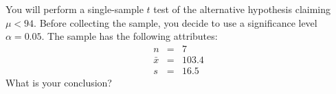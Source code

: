 \documentclass[11pt,containsverbatim,handout]{beamer}
\newcommand{\soln}[1]{ }
\begin{document}
\begin{frame}
You will perform a single-sample \(t\) test of the alternative
hypothesis claiming \(\mu<94\). Before collecting the sample, you decide to use a significance level \(\alpha = 0.05\). The sample has the following attributes: \[\begin{aligned}
n &=& 7 \\
\bar{x} &=& 103.4 \\
s &=& 16.5
\end{aligned}\] What is your conclusion?
\vfill
\pause

\soln{The alternative is claiming $\mu<94$. This sample mean is larger than 94! This definitely does not make us tempted to reject the null. Retain the null!}
\vfill

\end{frame}
\end{document}
